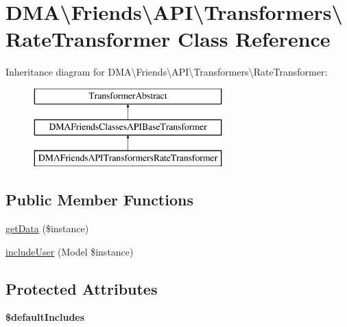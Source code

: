 \hypertarget{classDMA_1_1Friends_1_1API_1_1Transformers_1_1RateTransformer}{}\section{D\+M\+A\textbackslash{}Friends\textbackslash{}A\+P\+I\textbackslash{}Transformers\textbackslash{}Rate\+Transformer Class Reference}
\label{classDMA_1_1Friends_1_1API_1_1Transformers_1_1RateTransformer}
Inheritance diagram for D\+M\+A\textbackslash{}Friends\textbackslash{}A\+P\+I\textbackslash{}Transformers\textbackslash{}Rate\+Transformer\+:\begin{figure}[H]
\begin{center}
\leavevmode
\includegraphics[height=3.000000cm]{d3/df5/classDMA_1_1Friends_1_1API_1_1Transformers_1_1RateTransformer}
\end{center}
\end{figure}
\subsection*{Public Member Functions}
\begin{DoxyCompactItemize}
\item 
\hyperlink{classDMA_1_1Friends_1_1API_1_1Transformers_1_1RateTransformer_a27ed532bf412c45c32615058c9ff80bb}{get\+Data} (\$instance)
\item 
\hyperlink{classDMA_1_1Friends_1_1API_1_1Transformers_1_1RateTransformer_ae7ba3b8c09f2218ac4b771f8940a5921}{include\+User} (Model \$instance)
\end{DoxyCompactItemize}
\subsection*{Protected Attributes}
\begin{DoxyCompactItemize}
\item 
{\bfseries \$default\+Includes}
\end{DoxyCompactItemize}
